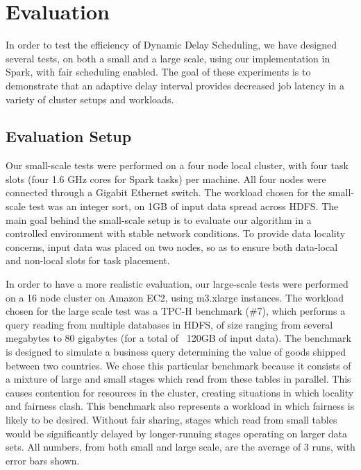 
\section{Evaluation}\label{sec:eval}

In order to test the efficiency of Dynamic Delay Scheduling, we have designed several 
tests, on both a small and a large scale, using our implementation in Spark, with fair
scheduling enabled. The goal of
these experiments is to demonstrate that an adaptive delay interval provides decreased
job latency in a variety of cluster setups and workloads.

\subsection{Evaluation Setup}
Our small-scale tests were performed on a four node local cluster, with four
task slots (four 1.6 GHz cores for Spark tasks) per machine. All four nodes were
connected through a Gigabit Ethernet switch. The workload chosen for the
small-scale test was an integer sort, on 1GB of input data spread across HDFS.
The main goal behind the small-scale setup is to evaluate our algorithm in a
controlled environment with stable network conditions. To provide data locality
concerns, input data was placed on two nodes, so as to ensure both data-local
and non-local slots for task placement.

In order to have a more realistic evaluation, our large-scale tests were
performed on a 16 node cluster on Amazon EC2, using m3.xlarge instances. The
workload chosen for the large scale test was a TPC-H benchmark (\#7), which
performs a query reading from multiple databases in HDFS, of size ranging from
several megabytes to 80 gigabytes (for a total of ~120GB of input data).
The benchmark is designed to simulate a business query determining the value of
goods shipped between two countries. We chose this particular benchmark because
it consists of a mixture of large and small stages which read from these tables
in parallel. This causes contention for resources in the cluster, creating
situations in which locality and fairness clash. This benchmark also represents
a workload in which fairness is likely to be desired. Without fair sharing,
stages which read from small tables would be significantly delayed by
longer-running stages operating on larger data sets.
All numbers, from both small and large scale, are the average of 3 runs, with
error bars shown.

